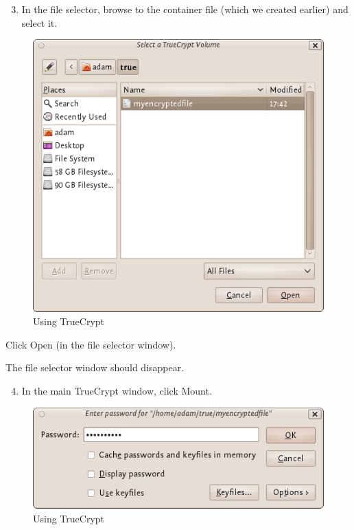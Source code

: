 \begin{enumerate}[1.]
\setcounter{enumi}{2}
\item
  In the file selector, browse to the container file (which we created
  earlier) and select it.
\end{enumerate}
\begin{figure}[htbp]
\centering
\includegraphics{using_tc_013.png}
\caption{Using TrueCrypt}
\end{figure}

Click Open (in the file selector window).

The file selector window should disappear.

\begin{enumerate}[1.]
\setcounter{enumi}{3}
\item
  In the main TrueCrypt window, click Mount.
\end{enumerate}
\begin{figure}[htbp]
\centering
\includegraphics{using_tc_014.png}
\caption{Using TrueCrypt}
\end{figure}


